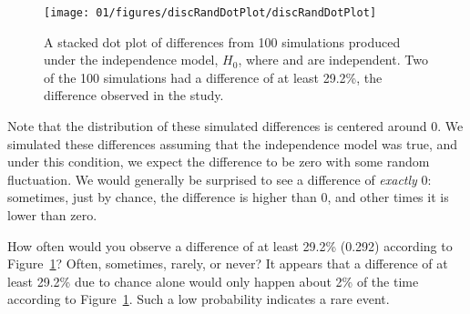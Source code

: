 \begin{figure}[ht]
\centering
\texttt{[image: 01/figures/discRandDotPlot/discRandDotPlot]}
\caption{A stacked dot plot of differences from 100 simulations produced under the independence model, $H_0$, where  and  are independent. Two of the 100 simulations had a difference of at least 29.2\%, the difference observed in the study.}
\label{discRandDotPlot}
\end{figure}

Note that the distribution of these simulated differences is centered around 0. We simulated these differences assuming that the independence model was true, and under this condition, we expect the difference to be zero with some random fluctuation. We would generally be surprised to see a difference of \emph{exactly} 0: sometimes, just by chance, the difference is higher than 0, and other times it is lower than zero.

\begin{example}{How often would you observe a difference of at least 29.2\% (0.292) according to Figure~\ref{discRandDotPlot}? Often, sometimes, rarely, or never?}
It appears that a difference of at least 29.2\% due to chance alone would only happen about 2\% of the time according to Figure~\ref{discRandDotPlot}. Such a low probability indicates a rare event.
\end{example}

